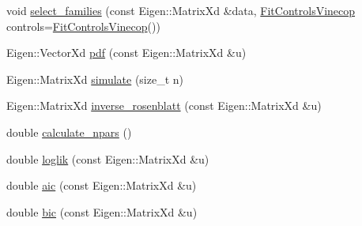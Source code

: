 \begin{DoxyCompactItemize}
$$\item 
void \hyperlink{classvinecopulib_1_1_vinecop_a15ca60a0770dab0786b134fc80d1e77d}{select\+\_\+families} (const Eigen\+::\+Matrix\+Xd \&data, \hyperlink{classvinecopulib_1_1_fit_controls_vinecop}{Fit\+Controls\+Vinecop} controls=\hyperlink{classvinecopulib_1_1_fit_controls_vinecop}{Fit\+Controls\+Vinecop}())
\item 
Eigen\+::\+Vector\+Xd \hyperlink{classvinecopulib_1_1_vinecop_adf3760b8dd2b6d3a9cae5426188d4489}{pdf} (const Eigen\+::\+Matrix\+Xd \&u)
\item 
Eigen\+::\+Matrix\+Xd \hyperlink{classvinecopulib_1_1_vinecop_aa88f63a1fa62dce205c4c197d9deb152}{simulate} (size\+\_\+t n)
\item 
Eigen\+::\+Matrix\+Xd \hyperlink{classvinecopulib_1_1_vinecop_ac64ae8072851ea1cd4ed7143cac92933}{inverse\+\_\+rosenblatt} (const Eigen\+::\+Matrix\+Xd \&u)
\item 
double \hyperlink{classvinecopulib_1_1_vinecop_a507ad836872f9f702eed22ba25212515}{calculate\+\_\+npars} ()
\item 
double \hyperlink{classvinecopulib_1_1_vinecop_a53105af3a02ad07af454333733c21495}{loglik} (const Eigen\+::\+Matrix\+Xd \&u)
\item 
double \hyperlink{classvinecopulib_1_1_vinecop_afab8444e538c976fa601ab946dd76252}{aic} (const Eigen\+::\+Matrix\+Xd \&u)
\item 
double \hyperlink{classvinecopulib_1_1_vinecop_a3bee8adb75dee19687309a40bbd72000}{bic} (const Eigen\+::\+Matrix\+Xd \&u)
\end{DoxyCompactItemize}
